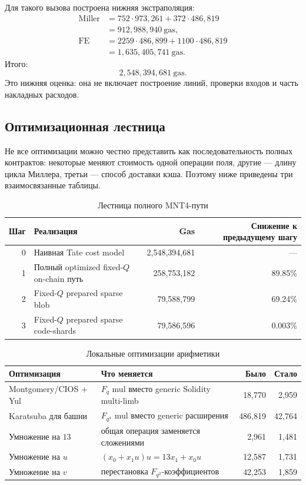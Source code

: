 \documentclass[12pt,a4paper]{article}
\newcommand{\Gas}{\mathrm{gas}}
\begin{document}
Для такого вызова построена нижняя экстраполяция:
\[
\begin{aligned}
    \text{Miller} &=
    752\cdot 973{,}261+372\cdot 486{,}819\\
    &=912{,}988{,}940\ \Gas,\\
    \text{FE} &=
    2259\cdot 486{,}899+1100\cdot 486{,}819\\
    &=1{,}635{,}405{,}741\ \Gas.
\end{aligned}
\]
Итого:
\[
    2{,}548{,}394{,}681\ \Gas.
\]
Это нижняя оценка: она не включает построение линий, проверки входов и часть
накладных расходов.

\subsection{Оптимизационная лестница}

Не все оптимизации можно честно представить как последовательность полных
контрактов: некоторые меняют стоимость одной операции поля, другие ---
длину цикла Миллера, третьи --- способ доставки кэша. Поэтому ниже приведены
три взаимосвязанные таблицы.

\begin{table}[htbp]
\centering
\caption{Лестница полного MNT4-пути}
\small
\begin{tabularx}{\linewidth}{r Y r r}
\toprule
Шаг & Реализация & Gas & Снижение к предыдущему шагу \\
 & Наивная Tate cost model & 2,548,394,681 & --- \\
1 & Полный optimized fixed-$Q$ on-chain путь & 258,753,182 & 89.85\% \\
2 & Fixed-$Q$ prepared sparse blob & 79,588,799 & 69.24\% \\
3 & Fixed-$Q$ prepared sparse code-shards & 79,586,596 & 0.003\% \\
\bottomrule
\end{tabularx}
\end{table}

\begin{table}[htbp]
\centering
\caption{Локальные оптимизации арифметики}
\small
\begin{tabularx}{\linewidth}{Y Y r r}
\toprule
Оптимизация & Что меняется & Было & Стало \\
\midrule
Montgomery/CIOS + Yul & $F_q$ mul вместо generic Solidity multi-limb &
18,770 & 2,959 \\
Karatsuba для башни & $F_{q^4}$ mul вместо generic расширения &
486,819 & 42,764 \\
Умножение на $13$ & общая операция заменяется сложениями &
2,961 & 1,481 \\
Умножение на $u$ & $(x_0+x_1u)u=13x_1+x_0u$ &
12,587 & 1,731 \\
Умножение на $v$ & перестановка $F_{q^2}$-коэффициентов &
42,253 & 1,859 \\
\bottomrule
\end{tabularx}
\end{table}
\end{document}
